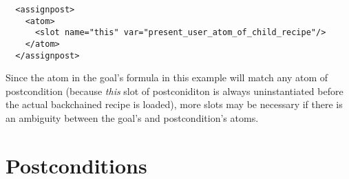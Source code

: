 \lstset{language=XML}
\begin{lstlisting}
  <assignpost>
    <atom>
      <slot name="this" var="present_user_atom_of_child_recipe"/>
    </atom>
  </assignpost>
\end{lstlisting}

Since the atom in the goal's formula in this example will match any atom of postcondition (because \textsl{this} slot of postconiditon is always uninstantiated before the actual backchained recipe is loaded), more slots may be necessary if there is an ambiguity between the goal's and postcondition's atoms.

\section{Postconditions}


